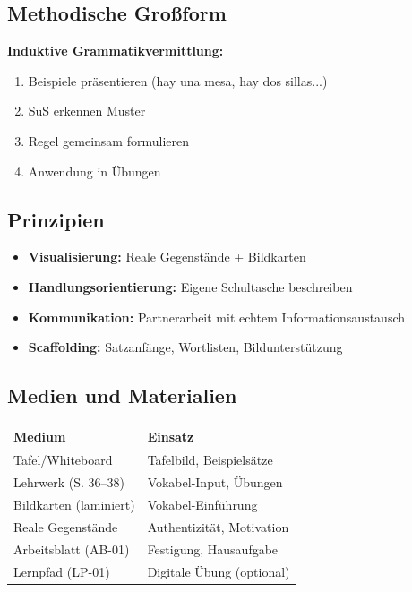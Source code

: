 \documentclass[11pt,a4paper]{article}
\begin{document}
\subsection{Methodische Großform}

\textbf{Induktive Grammatikvermittlung:}
\begin{enumerate}
    \item Beispiele präsentieren (hay una mesa, hay dos sillas...)
    \item SuS erkennen Muster
    \item Regel gemeinsam formulieren
    \item Anwendung in Übungen
\end{enumerate}

\subsection{Prinzipien}

\begin{itemize}
    \item \textbf{Visualisierung:} Reale Gegenstände + Bildkarten
    \item \textbf{Handlungsorientierung:} Eigene Schultasche beschreiben
    \item \textbf{Kommunikation:} Partnerarbeit mit echtem Informationsaustausch
    \item \textbf{Scaffolding:} Satzanfänge, Wortlisten, Bildunterstützung
\end{itemize}

\subsection{Medien und Materialien}

\begin{tabular}{|l|l|}
\hline
\textbf{Medium} & \textbf{Einsatz} \\
\hline
Tafel/Whiteboard & Tafelbild, Beispielsätze \\
Lehrwerk (S. 36--38) & Vokabel-Input, Übungen \\
Bildkarten (laminiert) & Vokabel-Einführung \\
Reale Gegenstände & Authentizität, Motivation \\
Arbeitsblatt (AB-01) & Festigung, Hausaufgabe \\
Lernpfad (LP-01) & Digitale Übung (optional) \\
\hline
\end{tabular}
\end{document}
